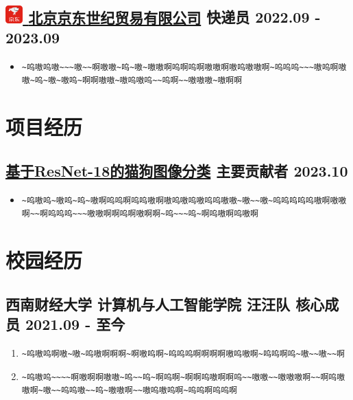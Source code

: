 \documentclass{resume}
\begin{document}
\subsection[北京京东世纪贸易有限公司]{\href{https://zhaopin.jd.com/}{\includegraphics[align=c, height=1.2em]{img/京东.pdf} \textbf{北京京东世纪贸易有限公司}} \quad 快递员 \hfill {\small 2022.09 - 2023.09}}
\begin{itemize}
    \item \lstinline|~呜嗷呜嗷~~~嗷~~啊嗷嗷~呜~嗷~嗷嗷啊呜啊呜啊嗷嗷啊嗷呜嗷嗷啊~呜呜呜~~~嗷呜啊嗷嗷~呜~嗷~嗷呜~啊啊嗷嗷~嗷呜嗷呜~~呜啊~~嗷嗷嗷~嗷啊啊|
\end{itemize}
\section[项目经历]{ \textbf{\color{mainColor}项目经历}}

\subsection[基于ResNet-18的猫狗图像分类]{\href{https://www.kaggle.com/code/marquis03/cats-and-dogs-classification-using-resnet-18}{\textbf{基于ResNet-18的猫狗图像分类}} \quad 主要贡献者 \hfill {\small 2023.10}}
\begin{itemize}
    \item \lstinline|~呜嗷呜~嗷呜~呜~嗷啊呜呜啊呜呜嗷啊嗷呜嗷呜嗷呜呜嗷嗷~嗷~~嗷~呜呜呜呜呜嗷啊嗷嗷啊~~啊呜呜呜~~~嗷嗷啊啊呜啊嗷啊啊~呜~~~呜~啊呜嗷啊呜嗷啊|
\end{itemize}
\section[校园经历]{ \textbf{\color{mainColor}校园经历}}

\subsection[汪汪队 核心成员]{\textbf{西南财经大学} \textbf{计算机与人工智能学院} \textbf{汪汪队} \quad 核心成员 \hfill {\small 2021.09 - 至今}}

\begin{enumerate}
    \item \lstinline|~呜嗷呜啊嗷~嗷~呜嗷啊啊啊~啊嗷呜啊~呜呜呜啊啊啊啊嗷呜嗷啊~呜呜啊呜~嗷~~嗷~~啊|
    \item \lstinline|~呜嗷呜~~~~啊嗷啊啊嗷嗷~呜~~呜~啊呜啊~啊啊呜嗷啊啊呜~~嗷嗷~~嗷嗷嗷啊~~啊呜嗷嗷啊~嗷~~呜呜嗷~~呜~嗷嗷啊~~嗷呜嗷呜啊~呜呜啊呜呜啊|
\end{enumerate}
\end{document}
